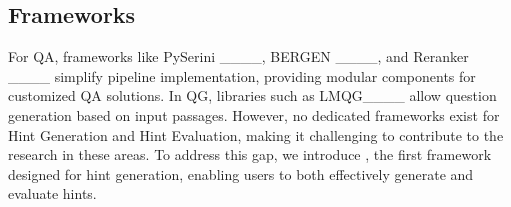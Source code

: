 \subsection{Frameworks} \label{ss:related_work_framework}
For QA, frameworks like PySerini ____, BERGEN ____, and Reranker ____ simplify pipeline implementation, providing modular components for customized QA solutions. In QG, libraries such as LMQG____ allow question generation based on input passages. However, no dedicated frameworks exist for Hint Generation and Hint Evaluation, making it challenging to contribute to the research in these areas.
To address this gap, we introduce \framework, the first framework designed for hint generation, enabling users to both effectively generate and evaluate hints.